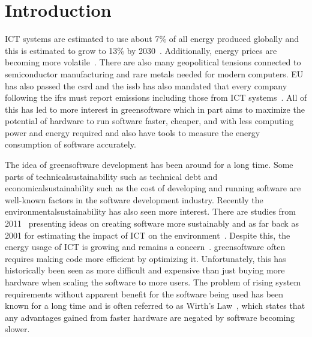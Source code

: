 \chapter{Introduction} \label{Introduction}
ICT systems are estimated to use about 7\% of all energy produced globally and this is estimated to grow to 13\% by 2030~\cite{europaPressCorner}. Additionally, energy prices are becoming more volatile~\cite{ieaGlobalEnergy}. There are also many geopolitical tensions connected to semiconductor manufacturing and rare metals needed for modern computers. EU has also passed the \gls{csrd} and the \gls{issb} has also mandated that every company following the \gls{ifrs} must report emissions including those from ICT systems~\cite{ifrsIFRSISSB}. All of this has led to more interest in \gls{greensoftware} which in part aims to maximize the potential of hardware to run software faster, cheaper, and with less computing power and energy required and also have tools to measure the energy consumption of software accurately.

The idea of \gls{greensoftware} development has been around for a long time. Some parts of \gls{technicalsustainability} such as technical debt and \gls{economicalsustainability} such as the cost of developing and running software are well-known factors in the software development industry. Recently the \gls{environmentalsustainability} has also seen more interest. There are studies from 2011~\cite{greensoft} presenting ideas on creating software more sustainably and as far back as 2001 for estimating the impact of ICT on the environment~\cite{ictimpact}. Despite this, the energy usage of ICT is growing and remains a concern~\cite{theimpactofinformationtechnology}. \Gls{greensoftware} often requires making code more efficient by optimizing it. Unfortunately, this has historically been seen as more difficult and expensive than just buying more hardware when scaling the software to more users. The problem of rising system requirements without apparent benefit for the software being used has been known for a long time and is often referred to as Wirth's Law~\cite{wirth}, which states that any advantages gained from faster hardware are negated by software becoming slower.

